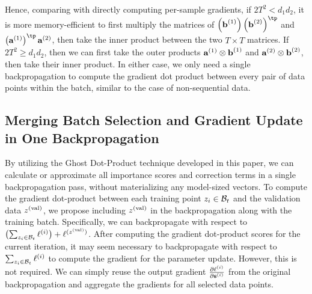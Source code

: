 Hence, comparing with directly computing per-sample gradients, if $2T^2 < d_1 d_2$, it is more memory-efficient to first multiply the matrices of $\left(\bb^{(1)}\right) \left(\bb^{(2)}\right)^{\tp}$ and $\left( \ba^{(1)} \right)^\tp \ba^{(2)}$, then take the inner product between the two $T \times T$ matrices. If $2 T^2 \ge d_1 d_2$, then we can first take the outer products $\textbf{a}^{(1)} \otimes \textbf{b}^{(1)}$ and $\textbf{a}^{(2)} \otimes \textbf{b}^{(2)}$, then take their inner product. In either case, we only need a single backpropagation to compute the gradient dot product between every pair of data points within the batch, similar to the case of non-sequential data. 

\subsection{Merging Batch Selection and Gradient Update in One Backpropagation}
\label{appendix:efficiency-bookkeeping}

By utilizing the Ghost Dot-Product technique developed in this paper, we can calculate or approximate all importance scores and correction terms in a single backpropagation pass, without materializing any model-sized vectors. To compute the gradient dot-product between each training point \(z_i \in \mathcal{B}_t\) and the validation data \(z^{(\mathrm{val})}\), we propose including \(z^{(\mathrm{val})}\) in the backpropagation along with the training batch. Specifically, we can backpropagate with respect to $\left(\sum_{z_i \in \mathcal{B}_t} \ell^{(i)}\right) + \ell^{(z^{(\mathrm{val})})}$. After computing the gradient dot-product scores for the current iteration, it may seem necessary to backpropagate with respect to \(\sum_{z_i \in \mathcal{B}_t} \ell^{(i)}\) to compute the gradient for the parameter update. However, this is not required. We can simply reuse the output gradient \(\frac{\partial \ell^{(i)}}{\partial \textbf{s}^{(i)}}\) from the original backpropagation and aggregate the gradients for all selected data points.